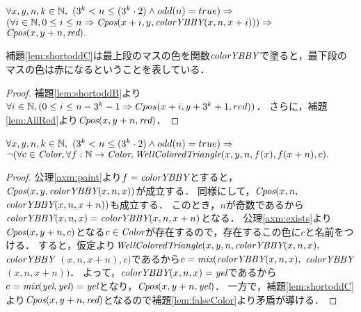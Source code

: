 \begin{lem}[\ShortOddC] \label{lem:shortoddC}
  $\forall x,y,n,k \in \mathbb{N},$
  $(3^k < n \leq (3^k\cdot2) \land odd(n) = true) \Rightarrow$
  $(\forall i \in \mathbb{N}, 0 \leq i \leq n \Rightarrow \textit{Cpos}(x+i,y,\textit{colorYBBY}(x,n,x+i))) \Rightarrow$
  $\textit{Cpos}(x,y+n,\textit{red}).$
\end{lem}
補題\ref{lem:shortoddC}は最上段のマスの色を関数$\textit{colorYBBY}$で塗ると，最下段のマスの色は赤になるということを表している．
\begin{proof}
  補題\ref{lem:shortoddB}より$\forall i \in \mathbb{N}, (0 \leq i \leq n - 3^k-1 \Rightarrow Cpos(x+i,y+3^k+1,red))$．
  さらに，補題\ref{lem:AllRed}より$\textit{Cpos}(x,y+n,\textit{red})$．
\end{proof}

\begin{lem}[\ShortOdd] \label{lem:shortodd}
  $\forall x,y,n,k \in \mathbb{N},$
  $(3^k < n \leq (3^k\cdot2) \land odd(n) = true) \Rightarrow$
  $\lnot(\forall c \in \textit{Color}, \forall f:\mathbb{N} \to \textit{Color}, \textit{WellColoredTriangle}(x,y,n,f(x),f(x+n), c).$
\end{lem}
\begin{proof}
  公理\ref{axm:paint}より$f=\textit{colorYBBY}$とすると，$\textit{Cpos}(x,y,\textit{colorYBBY}(x,n,x))$が成立する．
  同様にして，$\textit{Cpos}(x,n,$ $\textit{colorYBBY}(x,n,x+n))$も成立する．
  このとき，$n$が奇数であるから$\textit{colorYBBY}(x,n,x)=\textit{colorYBBY}(x,n,x+n)$となる．
  公理\ref{axm:exists}より$\textit{Cpos}(x,y+n,c)$となる$c\in\textit{Color}$が存在するので，存在するこの色に$c$と名前をつける．
  すると，仮定より$\textit{WellColoredTriangle}(x,y,n,\textit{colorYBBY}(x,n,x),$ $\textit{colorYBBY}$ $(x,n,x+n),c)$であるから$c=\textit{mix}(\textit{colorYBBY}(x,n,x),$ $\textit{colorYBBY}$ $(x,n,x+n))$．
  よって，$\textit{colorYBBY}(x,n,x)=\textit{yel}$であるから$c=\textit{mix}(\textit{yel},\textit{yel})=\textit{yel}$となり，$\textit{Cpos}(x,y+n,\textit{yel})$．
  一方で，補題\ref{lem:shortoddC}より$\textit{Cpos}(x,y+n,\textit{red})$となるので補題\ref{lem:falseColor}より矛盾が導ける．
\end{proof}


